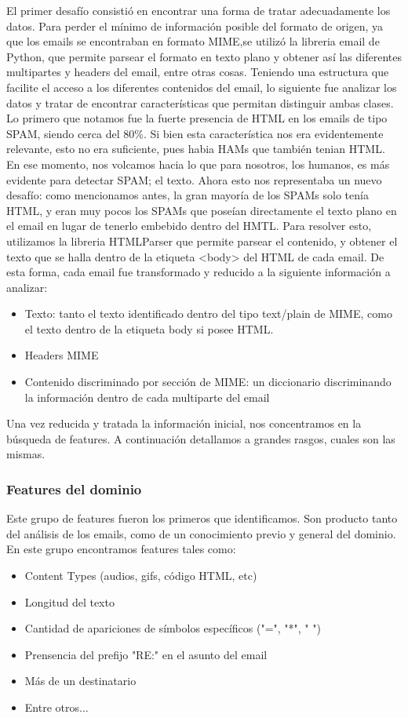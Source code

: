 El primer desafío consistió en encontrar una forma de tratar adecuadamente los datos. Para perder el mínimo de información posible del formato de origen, ya que los emails se encontraban en formato MIME,se utilizó la libreria email \cite{pythonemail} de Python, que permite parsear el formato en texto plano y obtener así las diferentes multipartes y headers del email, entre otras cosas.
Teniendo una estructura que facilite el acceso a los diferentes contenidos del email, lo siguiente fue analizar los datos y tratar de encontrar características que permitan distinguir ambas clases.
Lo primero que notamos fue la fuerte presencia de HTML en los emails de tipo SPAM, siendo cerca del 80\%. Si bien esta característica nos era evidentemente relevante, esto no era suficiente, pues habia HAMs que también tenian HTML. En ese momento, nos volcamos hacia lo que para nosotros, los humanos, es más evidente para detectar SPAM; el texto. Ahora esto nos representaba un nuevo desafío: como mencionamos antes, la gran mayoría de los SPAMs solo tenía HTML, y eran muy pocos los SPAMs que poseían directamente el texto plano en el email en lugar de tenerlo embebido dentro del HMTL. Para resolver esto, utilizamos la libreria HTMLParser \cite{htmlparser} que permite parsear el contenido, y obtener el texto que se halla dentro de la etiqueta <body> del HTML de cada email.
De esta forma, cada email fue transformado y reducido a la siguiente información a analizar:
\begin{itemize}
    \item Texto: tanto el texto identificado dentro del tipo text/plain de MIME, como el texto dentro de la etiqueta body si posee HTML.
    \item Headers MIME
    \item Contenido discriminado por sección de MIME: un diccionario discriminando la información dentro de cada multiparte del email
\end{itemize}

Una vez reducida y tratada la información inicial, nos concentramos en la búsqueda de features. A continuación detallamos a grandes rasgos, cuales son las mismas.


\subsubsection*{Features del dominio}
Este grupo de features fueron los primeros que identificamos. Son producto tanto del análisis de los emails, como de un conocimiento previo y general del dominio. En este grupo encontramos features tales como: 
\begin{itemize}
    \item Content Types (audios, gifs, código HTML, etc)
    \item Longitud del texto
    \item Cantidad de apariciones de símbolos específicos ("=", "*", " ")
    \item Prensencia del prefijo "RE:" en el asunto del email
    \item Más de un destinatario
    \item Entre otros...
\end{itemize}


